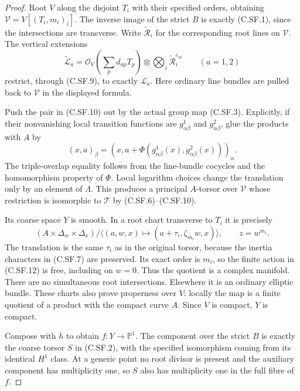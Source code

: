 \begin{proof}
Root $V$ along the disjoint
$T_i$ with their specified
orders, obtaining
$\mathcal V=V[(T_i,m_i)_i]$.
The inverse image of the strict
$B$ is exactly (C.SF.1), since
the intersections are transverse.
Write $\widetilde{\mathcal R}_i$
for the corresponding root lines
on $\mathcal V$. The vertical
extensions
\[
 \widetilde{\mathcal L}_a
   =\mathcal O_V\left(\sum_p d_{ap}T_p\right)
       \otimes\bigotimes_i
                       \widetilde{\mathcal R}_i^{e_{ai}}
                          \qquad(a=1,2)
                                                               \tag{C.SF.10}
\]
restrict, through (C.SF.9), to
exactly $\mathcal L_a$. Here
ordinary line bundles are pulled
back to $\mathcal V$ in the
displayed formula.

Push the pair in (C.SF.10)
out by the actual group map
(C.SF.3). Explicitly, if their
nonvanishing local transition
functions are $g^1_{\alpha\beta}$
and $g^2_{\alpha\beta}$, glue
the products with $A$ by
\[
 (x,a)_\beta=(x,a+
     \Phi(g^1_{\alpha\beta}(x),
          g^2_{\alpha\beta}(x)))_\alpha.
                                                               \tag{C.SF.11}
\]
The triple-overlap equality follows
from the line-bundle cocycles and
the homomorphism property of $\Phi$.
Local logarithm choices change the
translation only by an element
of $\Lambda$. This produces a
principal $A$-torsor over
$\mathcal V$ whose restriction
is isomorphic to $\mathcal T$
by (C.SF.6)--(C.SF.10).

Its coarse space $Y$ is smooth.
In a root chart transverse to
$T_i$ it is precisely
\[
 (A\times\Delta_w\times\Delta_x)/
 \langle(a,w,x)\mapsto
             (a+\tau_i,\zeta_{m_i}w,x)\rangle,
 \qquad z=w^{m_i}.
                                                               \tag{C.SF.12}
\]
The translation is the same
$\tau_i$ as in the original
torsor, because the inertia
characters in (C.SF.7) are
preserved. Its exact order
is $m_i$, so the finite action
in (C.SF.12) is free, including
on $w=0$. Thus the quotient
is a complex manifold. There
are no simultaneous root
intersections. Elsewhere it
is an ordinary elliptic bundle.
These charts also prove
properness over $V$: locally
the map is a finite quotient
of a product with the compact
curve $A$. Since $V$ is
compact, $Y$ is compact.

Compose with $h$ to obtain
$f:Y\to\mathbb P^1$.
The component over the strict
$B$ is exactly the coarse
torsor $S$ in (C.SF.2), with
the specified isomorphism
coming from its identical
$H^1$ class. At a generic
point no root divisor is
present and the auxiliary
component has multiplicity
one, so $S$ also has
multiplicity one in the
full fibre of $f$.


\end{proof}
